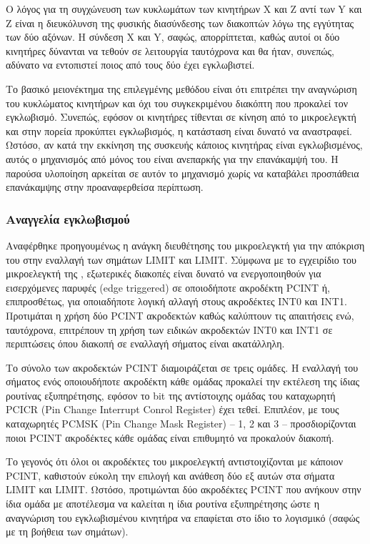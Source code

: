 Ο λόγος για τη συγχώνευση των κυκλωμάτων των κινητήρων X και Z αντί των Y και Z
είναι η διευκόλυνση της φυσικής διασύνδεσης των διακοπτών λόγω της εγγύτητας των
δύο αξόνων.
Η σύνδεση X και Y, σαφώς, απορρίπτεται, καθώς αυτοί οι δύο κινητήρες δύνανται να
τεθούν σε λειτουργία ταυτόχρονα και θα ήταν, συνεπώς, αδύνατο να εντοπιστεί
ποιος από τους δύο έχει εγκλωβιστεί.

Το βασικό μειονέκτημα της επιλεγμένης μεθόδου είναι ότι επιτρέπει την αναγνώριση
του κυκλώματος κινητήρων και όχι του συγκεκριμένου διακόπτη που προκαλεί τον
εγκλωβισμό. Συνεπώς, εφόσον οι κινητήρες τίθενται σε κίνηση από το μικροελεγκτή
και στην πορεία προκύπτει εγκλωβισμός, η κατάσταση είναι δυνατό να αναστραφεί.
Ωστόσο, αν κατά την εκκίνηση της συσκευής κάποιος κινητήρας είναι εγκλωβισμένος,
αυτός ο μηχανισμός από μόνος του είναι ανεπαρκής για την επανάκαμψή του. Η
παρούσα υλοποίηση αρκείται σε αυτόν το μηχανισμό χωρίς να καταβάλει προσπάθεια
επανάκαμψης στην προαναφερθείσα περίπτωση.

\subsubsection{Αναγγελία εγκλωβισμού}
\label{subsec:motor:limit-pin-change}

Αναφέρθηκε προηγουμένως η ανάγκη διευθέτησης του μικροελεγκτή για την απόκριση
του στην εναλλαγή των σημάτων LIMIT και LIMIT. Σύμφωνα με το
εγχειρίδιο του μικροελεγκτή της \textcite[71]{atmel13}, εξωτερικές διακοπές
είναι δυνατό να ενεργοποιηθούν για εισερχόμενες παρυφές (\textenglish{edge
triggered}) σε οποιοδήποτε ακροδέκτη PCINT ή, επιπροσθέτως, για οποιαδήποτε
λογική αλλαγή στους ακροδέκτες INT0 και INT1. Προτιμάται η χρήση δύο PCINT
ακροδεκτών καθώς καλύπτουν τις απαιτήσεις ενώ, ταυτόχρονα, επιτρέπουν τη χρήση
των ειδικών ακροδεκτών INT0 και INT1 σε περιπτώσεις όπου διακοπή σε εναλλαγή
σήματος είναι ακατάλληλη.

Το σύνολο των ακροδεκτών PCINT διαμοιράζεται σε τρεις ομάδες. Η εναλλαγή του
σήματος ενός οποιουδήποτε ακροδέκτη κάθε ομάδας προκαλεί την εκτέλεση της ίδιας
ρουτίνας εξυπηρέτησης, εφόσον το bit της αντίστοιχης ομάδας του καταχωρητή PCICR
(\textenglish{Pin Change Interrupt Conrol Register}) έχει τεθεί. Επιπλέον, με
τους καταχωρητές PCMSK (\textenglish{Pin Change Mask Register}) -- 1, 2 και 3 --
προσδιορίζονται ποιοι PCINT ακροδέκτες κάθε ομάδας είναι επιθυμητό να προκαλούν
διακοπή.

Το γεγονός ότι όλοι οι ακροδέκτες του μικροελεγκτή αντιστοιχίζονται με κάποιον
PCINT, καθιστούν εύκολη την επιλογή και ανάθεση δύο εξ αυτών στα σήματα
LIMIT και LIMIT. Ωστόσο, προτιμώνται δύο ακροδέκτες PCINT που
ανήκουν στην ίδια ομάδα με αποτέλεσμα να καλείται η ίδια ρουτίνα εξυπηρέτησης
ώστε η αναγνώριση του εγκλωβισμένου κινητήρα να επαφίεται στο ίδιο το λογισμικό
(σαφώς με τη βοήθεια των σημάτων).
